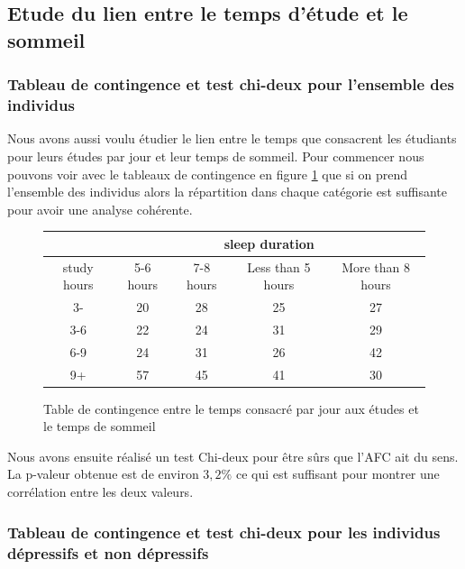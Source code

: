 \subsection{Etude du lien entre le temps d'étude et le sommeil}

\subsubsection{Tableau de contingence et test chi-deux pour l'ensemble des individus}

Nous avons aussi voulu étudier le lien entre le temps que consacrent les étudiants pour leurs études par jour et leur temps de sommeil.
Pour commencer nous pouvons voir avec le tableaux de contingence en figure \ref{tab:contTableStudySleepAll} que si on prend l'ensemble des individus alors la répartition dans chaque catégorie est suffisante pour avoir une analyse cohérente. 

\begin{figure}[!h]
    \begin{center}
      \begin{tabular}{|c|c|c|c|c|}
        \hline 
        & \multicolumn{4}{|c|}{sleep duration}\\ 
        \hline
        study hours & 5-6 hours & 7-8 hours & Less than 5 hours & More than 8 hours\\ 
        \hline 
        3- & 20 & 28 & 25 & 27\\ 
        \hline 
        3-6 & 22 & 24 & 31 & 29\\ 
        \hline 
        6-9 & 24 & 31 & 26 & 42\\ 
        \hline 
        9+ & 57 & 45 & 41 & 30 \\ 
        \hline
      \end{tabular}
    \end{center}
    \caption{Table de contingence entre le temps consacré par jour aux études et le temps de sommeil}
    \label{tab:contTableStudySleepAll}
\end{figure}

Nous avons ensuite réalisé un test Chi-deux pour être sûrs que l'AFC ait du sens. La p-valeur obtenue est de environ $3,2\%$ ce qui est suffisant pour montrer une corrélation entre les deux valeurs.

\subsubsection{Tableau de contingence et test chi-deux pour les individus dépressifs et non dépressifs}

